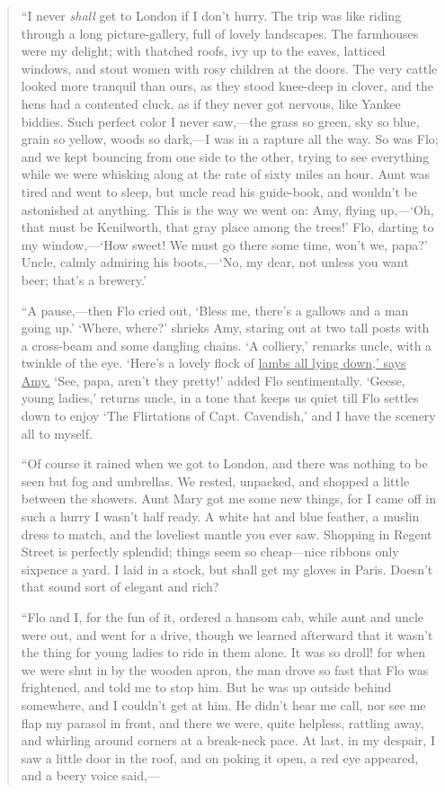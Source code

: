 \begin{quote}
``I never \emph{shall} get to London if I don't hurry.
The trip was like riding through a long picture-gallery, full of lovely
landscapes. The farmhouses were my delight; with thatched roofs, ivy up
to the eaves, latticed windows, and stout women with rosy children at
the doors. The very cattle looked more tranquil than ours, as they stood
knee-deep in clover, and the hens had a contented cluck, as if they
never got nervous, like Yankee biddies. Such perfect color I never
saw,---the grass so green, sky so blue, grain so yellow, woods so
dark,---I was in a rapture all the way. So was Flo; and we kept bouncing
from one side to the other, trying to see everything while we were
whisking along at the rate of sixty miles an hour. Aunt was tired and
went to sleep, but uncle read his guide-book, and
wouldn't be astonished at anything. This is the way we
went on: Amy, flying up,---`Oh, that must be Kenilworth,
that gray place among the trees!' Flo, darting to my
window,---`How sweet! We must go there some time,
won't we, papa?' Uncle, calmly admiring
his boots,---`No, my dear, not unless you want beer;
that's a brewery.'

``A pause,---then Flo cried out, `Bless me,
there's a gallows and a man going up.'
`Where, where?' shrieks Amy, staring
out at two tall posts with a cross-beam and some dangling chains.
`A colliery,' remarks uncle, with a
twinkle of the eye. `Here's a lovely
flock of \underline{lambs all lying down,' says Amy.}
`See, papa, aren't they
pretty!' added Flo sentimentally.
`Geese, young ladies,' returns uncle,
in a tone that keeps us quiet till Flo settles down to enjoy
`The Flirtations of Capt. Cavendish,'
and I have the scenery all to myself.

``Of course it rained when we got to London, and there was nothing to be
seen but fog and umbrellas. We rested, unpacked, and shopped a little
between the showers. Aunt Mary got me some new things, for I came off in
such a hurry I wasn't half ready. A white hat and blue
feather, a muslin dress to match, and the loveliest mantle you ever saw.
Shopping in Regent Street is perfectly splendid; things seem so
cheap---nice ribbons only sixpence a yard. I laid in a stock, but shall
get my gloves in Paris. Doesn't that sound sort of
elegant and rich?

``Flo and I, for the fun of it, ordered a hansom cab, while aunt and
uncle were out, and went for a drive, though we learned afterward that
it wasn't the thing for young ladies to ride in them
alone. It was so droll! for when we were shut in by the wooden apron,
the man drove so fast that Flo was frightened, and told me to stop him.
But he was up outside behind somewhere, and I couldn't
get at him. He didn't hear me call, nor see me flap my
parasol in front, and there we were, quite helpless, rattling away, and
whirling around corners at a break-neck pace. At last, in my despair, I
saw a little door in the roof, and on poking it open, a red eye
appeared, and a beery voice said,---


\end{quote}
